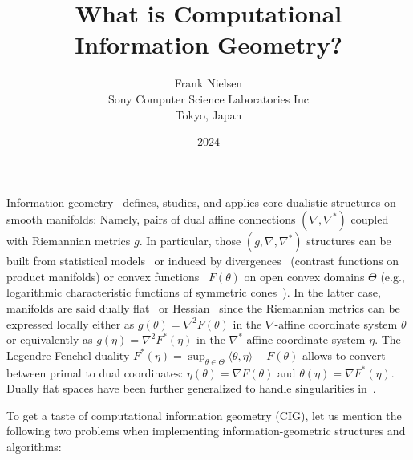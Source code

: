 \documentclass[11pt]{article}
\title{What is Computational Information Geometry?}
\author{Frank Nielsen\\ Sony Computer Science Laboratories Inc\\ Tokyo, Japan}
\date{2024}
\begin{document}
 \maketitle

\def\inner#1#2{\langle #1,#2\rangle}

Information geometry~\cite{IG-2016} defines, studies, and applies core dualistic structures on smooth manifolds: Namely, pairs of dual affine connections $(\nabla,\nabla^*)$ coupled with Riemannian metrics $g$. 
In particular, those $(g,\nabla,\nabla^*)$ structures can be built from statistical models~\cite{IG-2016} or induced by divergences~\cite{DIV-2010} (contrast functions on product manifolds) or  convex functions~\cite{Shima-2007} $F(\theta)$ on open convex domains $\Theta$ (e.g., logarithmic characteristic functions of symmetric cones~\cite{JordanAlgebraConnectionSymCone-2004,OharaEguchi-2014}).
In the latter case, manifolds are said dually flat~\cite{IG-2016} or Hessian~\cite{Shima-2007} since the Riemannian metrics can be expressed locally either as $g(\theta)=\nabla^2 F(\theta)$ in the $\nabla$-affine coordinate system $\theta$ or equivalently as $g(\eta)=\nabla^2 F^*(\eta)$ in the $\nabla^*$-affine coordinate system $\eta$. 
The Legendre-Fenchel duality 
$F^*(\eta)=\sup_{\theta\in\Theta} \inner{\theta}{\eta}-F(\theta)$ allows to convert between primal to dual coordinates: $\eta(\theta)=\nabla F(\theta)$ and $\theta(\eta)=\nabla F^*(\eta)$.
Dually flat spaces have been further generalized to handle singularities in~\cite{SingularDFS-2021}.

To get a taste of computational information geometry (CIG), let us mention 
 the following two problems when implementing information-geometric structures and algorithms:
 
\end{document}
